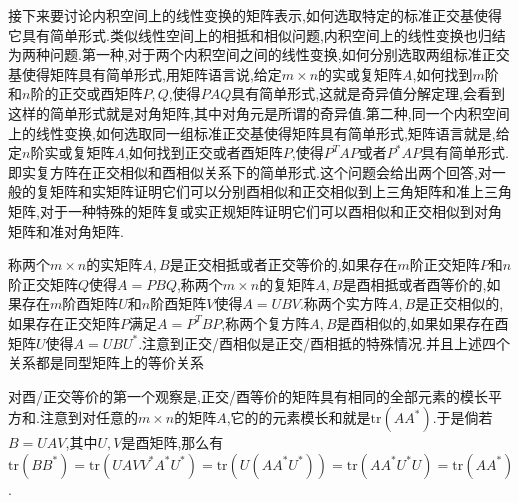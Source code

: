 接下来要讨论内积空间上的线性变换的矩阵表示,如何选取特定的标准正交基使得它具有简单形式.类似线性空间上的相抵和相似问题,内积空间上的线性变换也归结为两种问题.第一种,对于两个内积空间之间的线性变换,如何分别选取两组标准正交基使得矩阵具有简单形式,用矩阵语言说,给定$m\times n$的实或复矩阵$A$,如何找到$m$阶和$n$阶的正交或酉矩阵$P,Q$,使得$PAQ$具有简单形式,这就是奇异值分解定理,会看到这样的简单形式就是对角矩阵,其中对角元是所谓的奇异值.第二种,同一个内积空间上的线性变换,如何选取同一组标准正交基使得矩阵具有简单形式,矩阵语言就是,给定$n$阶实或复矩阵$A$,如何找到正交或者酉矩阵$P$,使得$P^TAP$或者$P^*AP$具有简单形式.即实复方阵在正交相似和酉相似关系下的简单形式.这个问题会给出两个回答,对一般的复矩阵和实矩阵证明它们可以分别酉相似和正交相似到上三角矩阵和准上三角矩阵,对于一种特殊的矩阵复或实正规矩阵证明它们可以酉相似和正交相似到对角矩阵和准对角矩阵.

称两个$m\times n$的实矩阵$A,B$是正交相抵或者正交等价的,如果存在$m$阶正交矩阵$P$和$n$阶正交矩阵$Q$使得$A=PBQ$,称两个$m\times n$的复矩阵$A,B$是酉相抵或者酉等价的,如果存在$m$阶酉矩阵$U$和$n$阶酉矩阵$V$使得$A=UBV$.称两个实方阵$A,B$是正交相似的,如果存在正交矩阵$P$满足$A=P^TBP$,称两个复方阵$A,B$是酉相似的,如果如果存在酉矩阵$U$使得$A=UBU^*$.注意到正交/酉相似是正交/酉相抵的特殊情况.并且上述四个关系都是同型矩阵上的等价关系

对酉/正交等价的第一个观察是,正交/酉等价的矩阵具有相同的全部元素的模长平方和.注意到对任意的$m\times n$的矩阵$A$,它的的元素模长和就是$\mathrm{tr}(AA^*)$.于是倘若$B=UAV$,其中$U,V$是酉矩阵,那么有$\mathrm{tr}(BB^*)=\mathrm{tr}(UAVV^*A^*U^*)=\mathrm{tr}(U(AA^*U^*))=\mathrm{tr}(AA^*U^*U)=\mathrm{tr}(AA^*)$.

